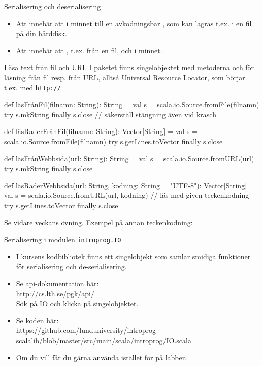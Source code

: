 


\begin{Slide}{Serialisering och deserialisering}
\begin{itemize}
  \item Att  innebär att  i minnet till en avkodningsbar , som kan lagras t.ex. i en fil på din hårddisk.
  \item Att  innebär att , t.ex. från en fil, och  i minnet.
\end{itemize}
\end{Slide}


\begin{Slide}{Läsa text från fil och URL}\SlideFontSmall
I paketet  finns singelobjektet  med metoderna  och  för läsning från fil resp. från  URL, alltså Universal Resource Locator, som börjar t.ex. med \texttt{http://}
\begin{Code}
def läsFrånFil(filnamn: String): String = 
  val s = scala.io.Source.fromFile(filnamn)
  try s.mkString finally s.close // säkerställ stängning även vid krasch

def läsRaderFrånFil(filnamn: String): Vector[String] =
  val s = scala.io.Source.fromFile(filnamn)
  try s.getLines.toVector finally s.close 

def läsFrånWebbsida(url: String): String = 
  val s = scala.io.Source.fromURL(url)
  try s.mkString finally s.close

def läsRaderWebbsida(url: String, kodning: String = "UTF-8"): Vector[String] =
  val s = scala.io.Source.fromURL(url, kodning) // läs med given teckenkodning
  try s.getLines.toVector finally s.close 

\end{Code}
{\SlideFontTiny Se vidare veckans övning. Exempel på annan teckenkodning:  }
\end{Slide}


\begin{Slide}{Serialisering i modulen \texttt{introprog.IO}}
\begin{itemize}
\item I kursens kodbibliotek  finns ett singelobjekt  som samlar smidiga funktioner för serialisering och de-serialisering. 
\item Se api-dokumentation här: \\ \url{http://cs.lth.se/pgk/api/} \\ Sök på IO och klicka på singelobjektet.
\item Se koden här:\\
\url{https://github.com/lunduniversity/introprog-scalalib/blob/master/src/main/scala/introprog/IO.scala}
\item Om du vill får du gärna använda  istället för  på labben.  
\end{itemize}
\end{Slide}
